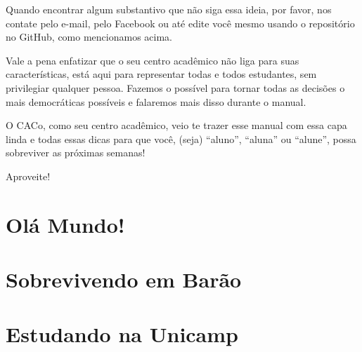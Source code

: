 \documentclass[a4paper,10pt,oldfontcommands]{memoir}
\begin{document}
Quando encontrar algum substantivo que não siga essa ideia, por favor, nos
contate pelo e-mail, pelo Facebook ou até edite você mesmo usando o repositório
no GitHub, como mencionamos acima.

Vale a pena enfatizar que o seu centro acadêmico não liga para suas
características, está aqui para representar todas e todos estudantes, sem
privilegiar qualquer pessoa. Fazemos o possível para tornar todas as decisões
o mais democráticas possíveis e falaremos mais disso durante o manual.

O CACo, como seu centro acadêmico, veio te trazer esse manual com essa capa
linda e todas essas dicas para que você, (seja) ``aluno'', ``aluna'' ou
``alune'', possa sobreviver as próximas semanas!

Aproveite!

\setlength{\parskip}{0em}
\mainmatter
\pagestyle{headings}
\twocolumn
\chapter{Olá Mundo!}


\clearpage


\clearpage


\clearpage



\chapter{Sobrevivendo em Barão}

\newpage

\newpage

\newpage

\newpage


\chapter{Estudando na Unicamp}

\newpage

\newpage

\newpage

\newpage

\newpage

\newpage

\newpage

\newpage

\end{document}
